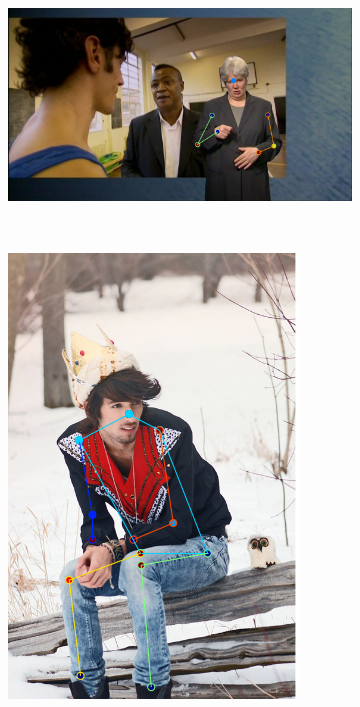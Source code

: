 \begin{figure}[t!]
\begin{subfigure}[b]{0.115\textwidth}
    \end{subfigure}
    \hfill
    \begin{subfigure}[b]{0.115\textwidth}
            \includegraphics[width=\textwidth]{resources/MotivativeAnnotation/BBCPose/bad_anno-4}
    \end{subfigure}
    \\
    \begin{subfigure}[b]{0.115\textwidth}
            \includegraphics[width=\textwidth]{resources/MotivativeAnnotation/FashionPose/bad_anno-1}

\end{subfigure}
\end{figure}
